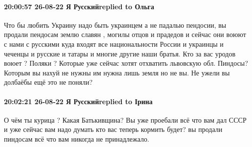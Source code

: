  
 
 
 
 

\paragraph{20:00:57 26-08-22 Я Русскийreplied to Ольга}

Что бы любить Украину надо быть украинцем а не падалью пендосии, вы продали
пендосам землю славян , могилы отцов и прадедов и сейчас они воюют с нами с
русскими куда входят все национальности России и украинцы и чеченцы и русские и
татары и многие другие наши братья. Кто за вас уродов воюет ? Поляки ? Которые
уже сейчас хотят отхватить львовскую обл. Пиндосы? Которым вы нахуй не нужны им
нужна лишь земля но не вы. Не ужели вы долбаёбы ещё это не поняли?

\paragraph{20:02:21 26-08-22 Я Русскийreplied to Ірина}

О чём ты курица ? Какая Батькивщина? Вы уже проебали всё что вам дал СССР и уже
сейчас вам надо думать кто вас теперь кормить будет? вы продали пиндосам всё
что вам никогда не принадлежало.
